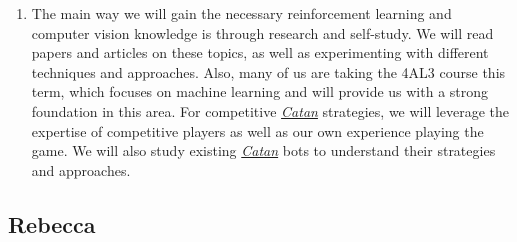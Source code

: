 \documentclass{article}
\newcommand{\Catan}{\href{https://en.wikipedia.org/wiki/Catan}{Catan}}
\begin{document}
\begin{enumerate}
    \item The main way we will gain the necessary reinforcement learning and computer vision
    knowledge is through research and self-study. We will read papers and articles on these topics,
    as well as experimenting with different techniques and approaches. Also, many of us are taking
    the 4AL3 course this term, which focuses on machine learning and will provide us with a strong
    foundation in this area. For competitive \emph{\Catan{}} strategies, we will leverage the expertise of
    competitive players as well as our own experience playing the game. We will also study existing \emph{\Catan{}} bots
    to understand their strategies and approaches.

\end{enumerate}

\subsection*{Rebecca}\label{subsec:rebecca}
\end{document}
